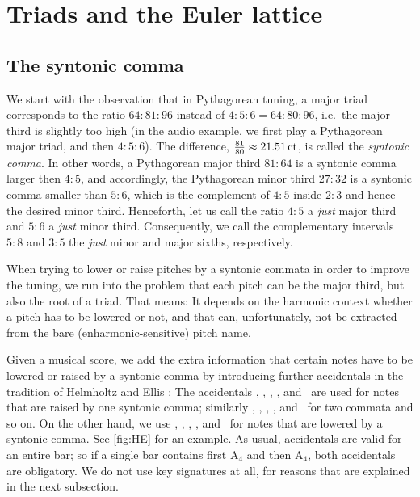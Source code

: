 \documentclass[british,11pt]{scrartcl}
\begin{document}

\section{Triads and the Euler lattice}

\subsection{The syntonic comma}

We start with the observation that in Pythagorean tuning, a major triad
corresponds to the ratio $64:81:96$ instead of $4:5:6=64:80:96$, i.e.\ the major
third is slightly too high (in the audio example, we first play a Pythagorean
major triad, and then $4:5:6$). The difference,
$\frac{81}{80}\approx 21.51\,\mathrm{ct}$, is called the \emph{syntonic comma}.  In
other words, a Pythagorean major third $81:64$ is a syntonic comma larger then
$4:5$, and accordingly, the Pythagorean minor third $27:32$ is a syntonic comma
smaller than $5:6$, which is the complement of $4:5$ inside $2:3$ and hence the
desired minor third. Henceforth, let us call the ratio $4:5$ a \emph{just} major
third and $5:6$ a \emph{just} minor third. Consequently, we call the
complementary intervals $5:8$ and $3:5$ the \emph{just} minor and major sixths,
respectively.

When trying to lower or raise pitches by a syntonic commata in order to improve
the tuning, we run into the problem that each pitch can be the major third, but
also the root of a triad. That means: It depends on the harmonic context whether
a pitch has to be lowered or not, and that can, unfortunately, not be extracted
from the bare (enharmonic-sensitive) pitch name.

Given a musical score, we add the extra information that certain notes have to
be lowered or raised by a syntonic comma by introducing further accidentals in
the tradition of Helmholtz and Ellis \cite{HE}: The accidentals \dsharpp,
\sharpp, \naturalp, \flatp, and \dflatp\ are used for notes that are raised by
one syntonic comma; similarly \dsharpp, \sharppp, \naturalpp, \flatpp, and
\dflatpp\ for two commata and so on. On the other hand, we use \dsharpm,
\sharpm, \naturalm, \flatm, and \flatmm\ for notes that are lowered by a
syntonic comma. See \cref{fig:HE} for an example.  As usual, accidentals are
valid for an entire bar; so if a single bar contains first \naturalm A$_4$ and
then \natural A$_4$, both accidentals are obligatory.  We do not use key
signatures at all, for reasons that are explained in the next
subsection.
\end{document}
